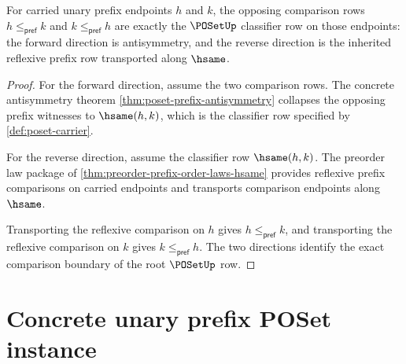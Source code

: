 \begin{theorem}
\label{thm:poset-root-exactness-obligation}
For carried unary prefix endpoints $h$ and $k$, the opposing comparison rows
$h\le_{\mathsf{pref}}k$ and $k\le_{\mathsf{pref}}h$ are exactly the
$\POSetUp$ classifier row on those endpoints: the forward direction is
antisymmetry, and the reverse direction is the inherited reflexive prefix row
transported along $\hsame$.
\end{theorem}
\begin{proof}
For the forward direction, assume the two comparison rows. The concrete
antisymmetry theorem \autoref{thm:poset-prefix-antisymmetry} collapses the
opposing prefix witnesses to $\hsame(h,k)$, which is the classifier row
specified by \autoref{def:poset-carrier}.

For the reverse direction, assume the classifier row $\hsame(h,k)$. The
preorder law package of \autoref{thm:preorder-prefix-order-laws-hsame}
provides reflexive prefix comparisons on carried endpoints and transports
comparison endpoints along $\hsame$.

Transporting the reflexive comparison on $h$ gives $h\le_{\mathsf{pref}}k$,
and transporting the reflexive comparison on $k$ gives
$k\le_{\mathsf{pref}}h$. The two directions identify the exact comparison
boundary of the root $\POSetUp$ row.
\end{proof}

\section{Concrete unary prefix POSet instance}
\label{sec:poset-concrete-unary-prefix-instance}

